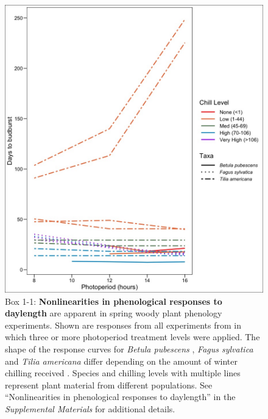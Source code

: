 \documentclass{article}
\begin{document}
\renewcommand{\thefigure}{\hspace{-.333333em}}

\begin{figure}[h]
\includegraphics{..//..//analyses/photoperiod/figures/Photo_curv_version2.jpeg} 
\caption{Box 1-1: \textbf{ Nonlinearities in phenological responses to daylength} are apparent in spring woody plant phenology experiments. Shown are responses from all experiments  from \citet{wolkovich2019}in which three or more photoperiod treatment levels were applied. The shape of the response curves for \textit{Betula pubescens} \citep{Caffarra:2011b}, \textit{Fagus sylvatica} \citep{Heide:1993a} and \textit{Tilia americana} \citep{Ashby:1962aa} differ depending on the amount of winter chilling received \citep[measured in Chill portions][]{fishman1987}. Species and chilling levels with multiple lines represent plant material from different populations. See ``Nonlinearities in phenological responses to daylength'' in the \emph{Supplemental Materials} for additional details.}

 \label{fig:photocurve}
 \end{figure}
\end{document}

